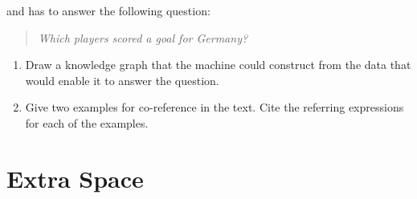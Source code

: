 \documentclass[12pt]{article}
\begin{document}
and has to answer the following question:

\begin{quotation}
\em Which players scored a goal for Germany?
\end{quotation}

\begin{enumerate}
\item Draw a knowledge graph that the machine could construct from the data that would enable it to answer the question.

\vskip 7cm

\item Give two examples for co-reference in the text. Cite the referring expressions for each of the examples.

\end{enumerate}

\newpage
\section*{Extra Space}
\newpage
\end{document}
